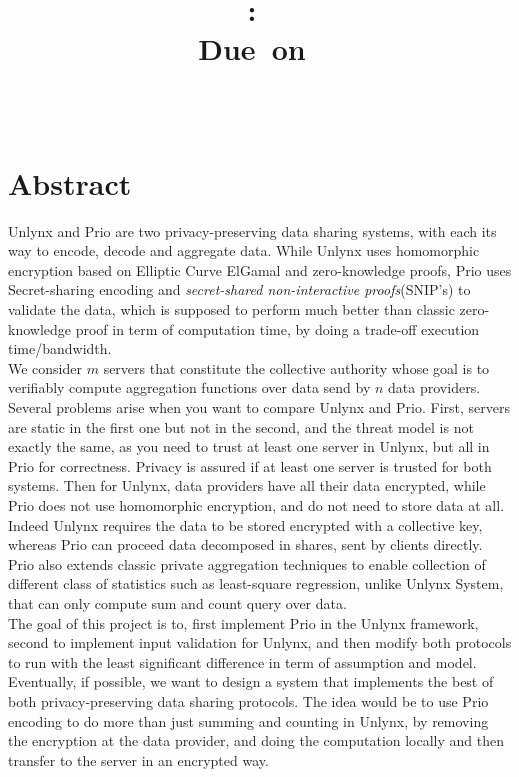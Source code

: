 \documentclass{article}
\title{
\logoepfl
\vspace{2in}
\textmd{\textbf{\hmwkClass:\ \hmwkTitle}}\\
\normalsize\vspace{0.1in}\small{Due\ on\ \hmwkDueDate}\\
\vspace{0.1in}\large{\textit{\hmwkClassInstructor\ \hmwkClassTime}}
\author{\textbf{\hmwkAuthorName}}
\vspace{3in}
}
\begin{document}
\maketitle

\newpage
\section*{Abstract}
Unlynx and Prio are two privacy-preserving data sharing systems, with each its way to encode, decode and aggregate data. While Unlynx uses homomorphic encryption based on Elliptic Curve ElGamal and zero-knowledge proofs, Prio uses Secret-sharing encoding and \textit{secret-shared non-interactive proofs}(SNIP's) to validate the data, which is supposed to perform much better than classic zero-knowledge proof in term of computation time, by doing a trade-off execution time/bandwidth.\\
We consider $m$ servers that constitute the collective authority whose goal is to verifiably compute aggregation functions over data send by $n$ data providers.\\
Several problems arise when you want to compare Unlynx and Prio. First, servers are static in the first one but not in the second, and the threat model is not exactly the same, as you need to trust at least one server in Unlynx, but all in Prio for correctness. Privacy is assured if at least one server is trusted for both systems. Then for Unlynx, data providers have all their data encrypted, while Prio does not use homomorphic encryption, and do not need to store data at all. Indeed Unlynx requires the data to be stored encrypted with a collective key, whereas Prio can proceed data decomposed in shares, sent by clients directly.\\
Prio also extends classic private aggregation techniques to enable collection of different class of statistics such as least-square regression, unlike Unlynx System, that can only compute sum and count query over data.\\
The goal of this project is to, first implement Prio in the Unlynx framework, second to implement input validation for Unlynx, and then modify both protocols to run with the least significant difference in term of assumption and model.\\
Eventually, if possible, we want to design a system that implements the best of both privacy-preserving data sharing protocols. The idea would be to use Prio encoding to do more than just summing and counting in Unlynx, by removing the encryption at the data provider, and doing the computation locally and then transfer to the server in an encrypted way.\\
\end{document}
